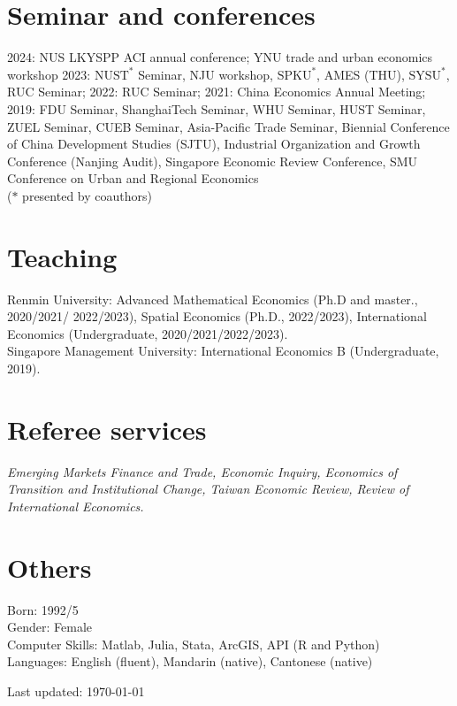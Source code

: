 \documentclass[letterpaper]{article}
\begin{document}
\section*{\textbf{Seminar and conferences}}
2024: NUS LKYSPP ACI annual conference; YNU trade and urban economics workshop 
2023: $\mathrm{NUST}^*$ Seminar, NJU workshop, $\mathrm{SPKU}^*$, AMES (THU), $\mathrm{SYSU}^*$, RUC Seminar; 2022: RUC Seminar; 2021: China Economics Annual Meeting; 2019: FDU Seminar, ShanghaiTech Seminar, WHU Seminar, HUST Seminar, ZUEL Seminar, CUEB Seminar,  Asia-Pacific Trade Seminar, Biennial Conference of China Development Studies (SJTU), Industrial Organization and Growth Conference (Nanjing Audit), Singapore Economic Review Conference,  SMU Conference on Urban and Regional Economics\\
($*$ presented by coauthors)
		
 \section*{\textbf{Teaching}}
 Renmin University: Advanced Mathematical Economics (Ph.D and master., 2020/2021/ 2022/2023),  Spatial Economics (Ph.D., 2022/2023), International Economics (Undergraduate, 2020/2021/2022/2023).   \\
Singapore Management University: International Economics B (Undergraduate, 2019).
 
 \section*{\textbf{Referee services}}
\textit{Emerging Markets Finance and Trade, Economic Inquiry, Economics of Transition and Institutional Change, Taiwan Economic Review, Review of International Economics.}


 \section*{\textbf{Others}}
 Born: 1992/5\\
 Gender: Female\\
 Computer Skills: Matlab, Julia, Stata, ArcGIS, API (R and Python)\\
 Languages: English (fluent), Mandarin (native), Cantonese (native)
		
	\bigskip
	
	\begin{center}
		\begin{footnotesize}
			Last updated: \today 
		\end{footnotesize}
	\end{center}
	
\end{document}
